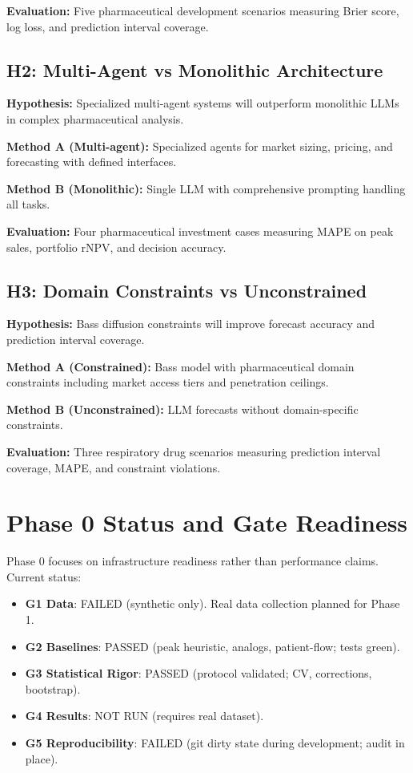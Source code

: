 \documentclass{article}
\begin{document}
\textbf{Evaluation:} Five pharmaceutical development scenarios measuring Brier score, log loss, and prediction interval coverage.

\subsection{H2: Multi-Agent vs Monolithic Architecture}

\textbf{Hypothesis:} Specialized multi-agent systems will outperform monolithic LLMs in complex pharmaceutical analysis.

\textbf{Method A (Multi-agent):} Specialized agents for market sizing, pricing, and forecasting with defined interfaces.

\textbf{Method B (Monolithic):} Single LLM with comprehensive prompting handling all tasks.

\textbf{Evaluation:} Four pharmaceutical investment cases measuring MAPE on peak sales, portfolio rNPV, and decision accuracy.

\subsection{H3: Domain Constraints vs Unconstrained}

\textbf{Hypothesis:} Bass diffusion constraints will improve forecast accuracy and prediction interval coverage.

\textbf{Method A (Constrained):} Bass model with pharmaceutical domain constraints including market access tiers and penetration ceilings.

\textbf{Method B (Unconstrained):} LLM forecasts without domain-specific constraints.

\textbf{Evaluation:} Three respiratory drug scenarios measuring prediction interval coverage, MAPE, and constraint violations.

\section{Phase 0 Status and Gate Readiness}

Phase 0 focuses on infrastructure readiness rather than performance claims. Current status:

\begin{itemize}
\item \textbf{G1 Data}: FAILED (synthetic only). Real data collection planned for Phase 1.
\item \textbf{G2 Baselines}: PASSED (peak heuristic, analogs, patient-flow; tests green).
\item \textbf{G3 Statistical Rigor}: PASSED (protocol validated; CV, corrections, bootstrap).
\item \textbf{G4 Results}: NOT RUN (requires real dataset).
\item \textbf{G5 Reproducibility}: FAILED (git dirty state during development; audit in place).
\end{itemize}
\end{document}
